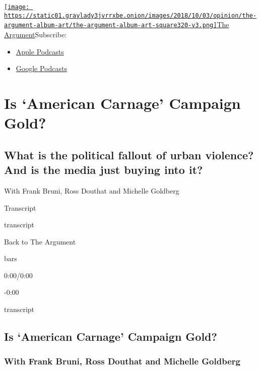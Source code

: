\href{https://www.nytimes3xbfgragh.onion/column/the-argument}{\texttt{[image: https://static01.graylady3jvrrxbe.onion/images/2018/10/03/opinion/the-argument-album-art/the-argument-album-art-square320-v3.png]}The
Argument}Subscribe:

\begin{itemize}
\tightlist
\item
  \href{https://itunes.apple.com/us/podcast/id1438024613}{Apple
  Podcasts}
\item
  \href{https://www.google.com/podcasts?feed=aHR0cHM6Ly9yc3MuYXJ0MTkuY29tL3RoZS1hcmd1bWVudA\%3D\%3D}{Google
  Podcasts}
\end{itemize}

\hypertarget{is-american-carnage-campaign-gold-1}{%
\section{Is `American Carnage' Campaign
Gold?}\label{is-american-carnage-campaign-gold-1}}

\hypertarget{what-is-the-political-fallout-of-urban-violence-and-is-the-media-just-buying-into-it-1}{%
\subsection{What is the political fallout of urban violence? And is the
media just buying into
it?}\label{what-is-the-political-fallout-of-urban-violence-and-is-the-media-just-buying-into-it-1}}

With Frank Bruni, Ross Douthat and Michelle Goldberg

Transcript

transcript

Back to The Argument

bars

0:00/0:00

-0:00

transcript

\hypertarget{is-american-carnage-campaign-gold-2}{%
\subsection{Is `American Carnage' Campaign
Gold?}\label{is-american-carnage-campaign-gold-2}}

\hypertarget{with-frank-bruni-ross-douthat-and-michelle-goldberg-1}{%
\subsubsection{With Frank Bruni, Ross Douthat and Michelle
Goldberg}\label{with-frank-bruni-ross-douthat-and-michelle-goldberg-1}}

